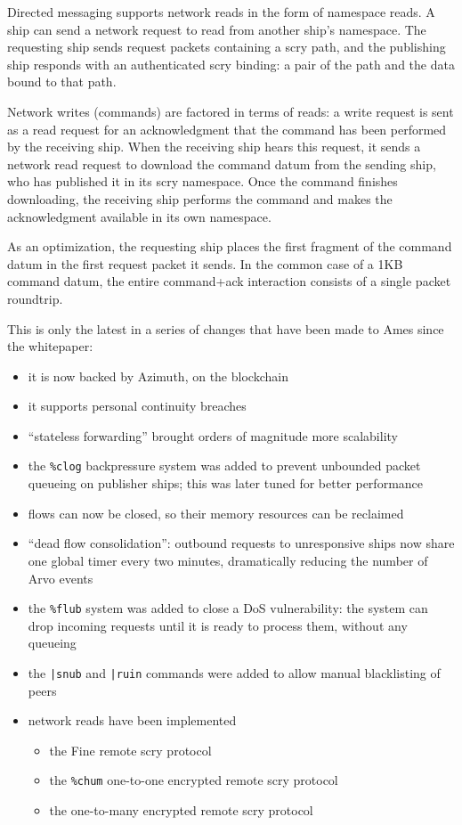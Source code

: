 \documentclass[twoside]{article}
\begin{document}
Directed messaging supports network reads in the form of namespace reads.  A ship can send a network request to read from another ship's namespace.  The requesting ship sends request packets containing a scry path, and the publishing ship responds with an authenticated scry binding: a pair of the path and the data bound to that path. 

Network writes (commands) are factored in terms of reads: a write request is sent as a read request for an acknowledgment that the command has been performed by the receiving ship.  When the receiving ship hears this request, it sends a network read request to download the command datum from the sending ship, who has published it in its scry namespace.  Once the command finishes downloading, the receiving ship performs the command and makes the acknowledgment available in its own namespace.

As an optimization, the requesting ship places the first fragment of the command datum in the first request packet it sends.  In the common case of a 1KB command datum, the entire command+ack interaction consists of a single packet roundtrip.

This is only the latest in a series of changes that have been made to Ames since the whitepaper:
\begin{itemize}
  \item  it is now backed by Azimuth, on the blockchain
  \item  it supports personal continuity breaches
  \item  ``stateless forwarding'' brought orders of magnitude more scalability
  \item  the \lstinline[style=inlinecode]{%clog} backpressure system was added to prevent unbounded packet queueing on publisher ships; this was later tuned for better performance
  \item  flows can now be closed, so their memory resources can be reclaimed
  \item  ``dead flow consolidation'': outbound requests to unresponsive ships now share one global timer every two minutes, dramatically reducing the number of Arvo events
  \item  the \lstinline[style=inlinecode]{%flub} system was added to close a DoS vulnerability: the system can drop incoming requests until it is ready to process them, without any queueing
  \item  the \lstinline[style=inlinecode]{|snub} and \lstinline[style=inlinecode]{|ruin} commands were added to allow manual blacklisting of peers
  \item  network reads have been implemented
  \begin{itemize}
    \item  the Fine remote scry protocol
    \item  the \lstinline[style=inlinecode]{%chum} one-to-one encrypted remote scry protocol
    \item  the one-to-many encrypted remote scry protocol
  \end{itemize}
\end{itemize}
\end{document}
